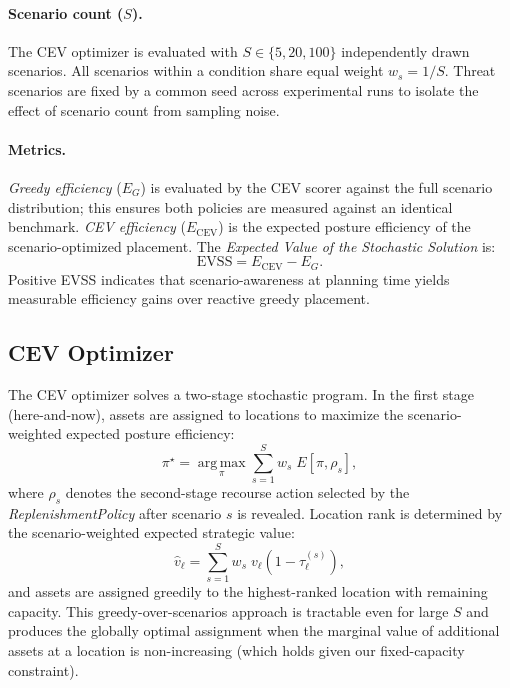 \documentclass[11pt]{article}
\begin{document}
\paragraph{Scenario count ($S$).}
The CEV optimizer is evaluated with $S \in \{5, 20, 100\}$ independently
drawn scenarios.  All scenarios within a condition share equal weight
$w_s = 1/S$.  Threat scenarios are fixed by a common seed across
experimental runs to isolate the effect of scenario count from sampling
noise.

\paragraph{Metrics.}
\emph{Greedy efficiency} ($E_G$) is evaluated by the CEV scorer against
the full scenario distribution; this ensures both policies are measured
against an identical benchmark.
\emph{CEV efficiency} ($E_\mathrm{CEV}$) is the expected posture
efficiency of the scenario-optimized placement.
The \emph{Expected Value of the Stochastic Solution} is:
\begin{equation}
    \mathrm{EVSS} = E_\mathrm{CEV} - E_G.
    \label{eq:evss}
\end{equation}
Positive EVSS indicates that scenario-awareness at planning time yields
measurable efficiency gains over reactive greedy placement.

\subsection{CEV Optimizer}
\label{sec:exp2:algorithm}

The CEV optimizer solves a two-stage stochastic program.
In the first stage (here-and-now), assets are assigned to locations to
maximize the scenario-weighted expected posture efficiency:
\begin{equation}
    \pi^\star = \operatorname*{arg\,max}_{\pi}
    \sum_{s=1}^{S} w_s \; E\!\left[\pi, \rho_s\right],
    \label{eq:cev}
\end{equation}
where $\rho_s$ denotes the second-stage recourse action selected by the
\emph{ReplenishmentPolicy} after scenario $s$ is revealed.
Location rank is determined by the scenario-weighted expected strategic
value:
\begin{equation}
    \hat{v}_\ell = \sum_{s=1}^{S} w_s \; v_\ell
    \left(1 - \tau_\ell^{(s)}\right),
    \label{eq:weighted_value}
\end{equation}
and assets are assigned greedily to the highest-ranked location with
remaining capacity.  This greedy-over-scenarios approach is tractable
even for large $S$ and produces the globally optimal assignment when
the marginal value of additional assets at a location is non-increasing
(which holds given our fixed-capacity constraint).
\end{document}
